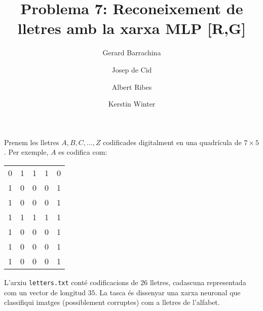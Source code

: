 \documentclass[a4paper]{article}
\author{
Gerard Barrachina
\and
Josep de Cid
\and
Albert Ribes
\and
Kerstin Winter
}
\title{Problema 7: Reconeixement de lletres amb la xarxa MLP [R,G]}
\begin{document}
    \maketitle
    Prenem les lletres $A, B, C, \dots, Z$ codificades digitalment en una quadrícula de $7\times5$. Per exemple, $A$ es
    codifica com:

    \begin{center}
        \begin{tabular}{c c c c c}
            0 & 1 & 1 & 1 & 0 \\
            1 & 0 & 0 & 0 & 1 \\
            1 & 0 & 0 & 0 & 1 \\
            1 & 1 & 1 & 1 & 1 \\
            1 & 0 & 0 & 0 & 1 \\
            1 & 0 & 0 & 0 & 1 \\
            1 & 0 & 0 & 0 & 1
        \end{tabular}
    \end{center}

    L'arxiu \texttt{letters.txt} conté codificacions de $26$ lletres, cadascuna representada com un vector de
    longitud $35$. La tasca és dissenyar una xarxa neuronal que classifiqui imatges (possiblement corruptes)
    com a lletres de l'alfabet.
\end{document}
